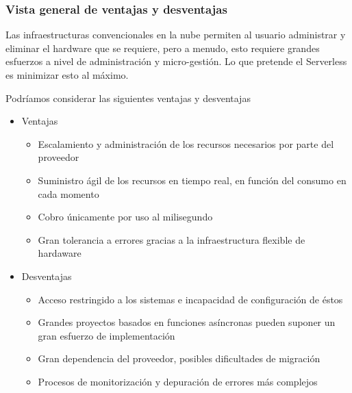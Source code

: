 \subsubsection{Vista general de ventajas y desventajas}
Las infraestructuras convencionales en la nube permiten al usuario administrar y eliminar el hardware que se requiere, pero a menudo, esto requiere grandes esfuerzos a nivel de administración y micro-gestión. Lo que pretende el Serverless es minimizar esto al máximo.
\par Podríamos considerar las siguientes ventajas y desventajas
\begin{itemize}
    \item Ventajas
    \begin{itemize}
        \item Escalamiento y administración de los recursos necesarios por parte del proveedor
        \item Suministro ágil de los recursos en tiempo real, en función del consumo en cada momento
        \item Cobro únicamente por uso al milisegundo
        \item Gran tolerancia a errores gracias a la infraestructura flexible de hardaware
    \end{itemize}
    \item Desventajas
    \begin{itemize}
        \item Acceso restringido a los sistemas e incapacidad de configuración de éstos
        \item Grandes proyectos basados en funciones asíncronas pueden suponer un gran esfuerzo de implementación
        \item Gran dependencia del proveedor, posibles dificultades de migración
        \item Procesos de monitorización y depuración de errores más complejos
    \end{itemize}
\end{itemize}
